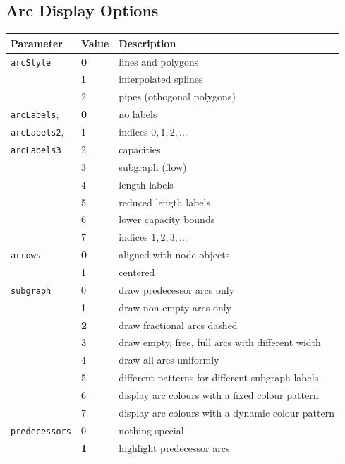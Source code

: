 \documentclass[a4paper,11pt,twoside]{book}
\begin{document}
\begin{multicols}{2}
\subsection{Arc Display Options}
\label{slb_arc_display}
\medskip
\begin{center}
\begin{tabular}{|p{2.5cm}|p{1.2cm}|p{8.0cm}|}
\hline
{\bf Parameter} & {\bf Value} & {\bf Description} \\
\hline
\hline
\verb/arcStyle/     & {\bf 0} & lines and polygons \\
                    & 1 & interpolated splines \\
                    & 2 & pipes (othogonal polygons) \\
\hline
\verb/arcLabels/,   & {\bf 0} & no labels \\
\verb/arcLabels2/,  & 1 & indices $0,1,2,...$\\
\verb/arcLabels3/   & 2 & capacities \\
                    & 3 & subgraph (flow) \\
                    & 4 & length labels \\
                    & 5 & reduced length labels \\
                    & 6 & lower capacity bounds \\
                    & 7 & indices $1,2,3,...$ \\
\hline
\verb/arrows/       & {\bf 0} & aligned with node objects \\
                    & 1 & centered \\
\hline
\verb/subgraph/     & 0 & draw predecessor arcs only \\
                    & 1 & draw non-empty arcs only \\
                    & {\bf 2} & draw fractional arcs dashed \\
                    & 3 & draw empty, free, full arcs with different width \\
                    & 4 & draw all arcs uniformly \\
                    & 5 & different patterns for different subgraph labels \\
                    & 6 & display arc colours with a fixed colour pattern \\
                    & 7 & display arc colours with a dynamic colour pattern \\
\hline
\verb/predecessors/ & 0 & nothing special \\
                    & {\bf 1} & highlight predecessor arcs \\
\hline
\end{tabular}
\end{center}
\bigskip



\end{multicols}
\end{document}
